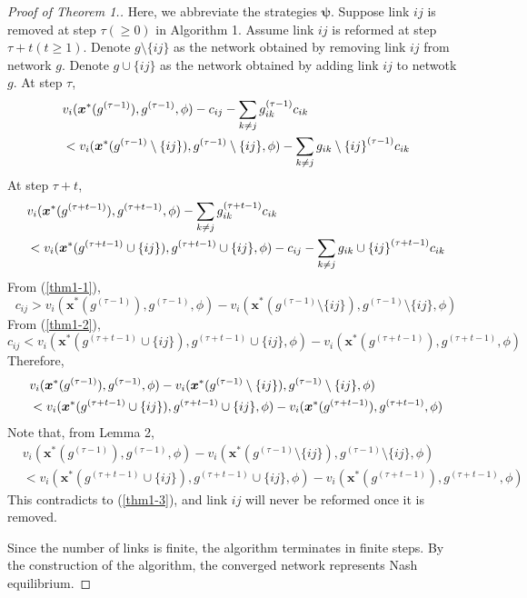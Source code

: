 \documentclass[12pt]{article}
\theoremstyle{definition}
\begin{document}
\begin{proof}[Proof of Theorem 1.]
	Here, we abbreviate the strategies $\bm{\psi}$.
	Suppose link $ij$ is removed at step $\tau(\ge0)$ in Algorithm 1.
	Assume link $ij$ is reformed at step $\tau + t (t \ge 1)$.
	Denote $g \setminus \{ ij \}$ as the network obtained by removing link $ij$ from network $g$.
	Denote $g \cup \{ ij \}$ as the network obtained by adding link $ij$ to netwotk $g$.
	At step $\tau$,
	\begin{align}
		\label{thm1-1}
		& v_i(\bm{x}^*(g^{(\tau - 1)}), g^{(\tau - 1)}, \phi) - c_{ij} - \sum_{k \neq j} g_{ik}^{(\tau - 1)} c_{ik} \notag \\
			& < v_i(\bm{x}^*(g^{(\tau - 1)} \setminus \{ ij \}), g^{(\tau - 1)} \setminus \{ ij \}, \phi) - \sum_{k \neq j} {g_{ik} \setminus \{ ij \}}^{(\tau - 1)} c_{ik}
	\end{align}
	At step $\tau + t$,
	\begin{align}
		\label{thm1-2}
		& v_i(\bm{x}^*(g^{(\tau + t-1)}), g^{(\tau + t-1)}, \phi) - \sum_{k \neq j} g_{ik}^{(\tau + t-1)} c_{ik} \notag \\
			& < v_i(\bm{x}^*(g^{(\tau + t-1)} \cup \{ ij \}), g^{(\tau + t-1)} \cup \{ ij \}, \phi) - c_{ij} - \sum_{k \neq j} {g_{ik} \cup \{ ij \}}^{(\tau + t-1)} c_{ik}
	\end{align}
	From (\ref{thm1-1}),
	\[ c_{ij} > v_i(\bm{x}^*(g^{(\tau - 1)}), g^{(\tau - 1)}, \phi) - v_i(\bm{x}^*(g^{(\tau - 1)} \setminus \{ ij \}), g^{(\tau - 1)} \setminus \{ ij \}, \phi) \]
	From (\ref{thm1-2}),
	\[ c_{ij} < v_i(\bm{x}^*(g^{(\tau + t-1)} \cup \{ ij \}), g^{(\tau + t-1)} \cup \{ ij \}, \phi) - v_i(\bm{x}^*(g^{(\tau + t-1)}), g^{(\tau + t-1)}, \phi) \]
	Therefore,
	\begin{align}
		\label{thm1-3}
		& v_i(\bm{x}^*(g^{(\tau - 1)}), g^{(\tau - 1)}, \phi) - v_i(\bm{x}^*(g^{(\tau - 1)} \setminus \{ ij \}), g^{(\tau - 1)} \setminus \{ ij \}, \phi) \notag \\
			& < v_i(\bm{x}^*(g^{(\tau + t-1)} \cup \{ ij \}), g^{(\tau + t-1)} \cup \{ ij \}, \phi) - v_i(\bm{x}^*(g^{(\tau + t-1)}), g^{(\tau + t-1)}, \phi)
	\end{align}
	Note that, from Lemma 2,
	\begin{align*}
		& v_i(\bm{x}^*(g^{(\tau - 1)}), g^{(\tau - 1)}, \phi) - v_i(\bm{x}^*(g^{(\tau - 1)} \setminus \{ ij \}), g^{(\tau - 1)} \setminus \{ ij \}, \phi) \\
			& < v_i(\bm{x}^*(g^{(\tau + t-1)} \cup \{ ij \}), g^{(\tau + t-1)} \cup \{ ij \}, \phi) - v_i(\bm{x}^*(g^{(\tau + t-1)}), g^{(\tau + t-1)}, \phi)
	\end{align*}
	This contradicts to (\ref{thm1-3}), and link $ij$ will never be reformed once it is removed.

	Since the number of links is finite, the algorithm terminates in finite steps.
	By the construction of the algorithm, the converged network represents Nash equilibrium.
\end{proof}
\end{document}
